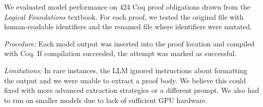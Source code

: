 We evaluated model performance on 424 Coq proof obligations drawn from the \textit{Logical Foundations} textbook.
For each proof, we tested the original file with human-readable identifiers and the renamed file where identifiers were mutated.

\noindent\textit{Procedure:}
Each model output was inserted into the proof location and compiled with Coq. If compilation succeeded, the attempt was marked as successful.

\noindent\textit{Limitations:}
In rare instances, the LLM ignored instructions about formatting the output and we were unable to extract a proof body.
We believe this could fixed with more advanced extraction strategies or a different prompt.
We also had to run on smaller models due to lack of sufficient GPU hardware.